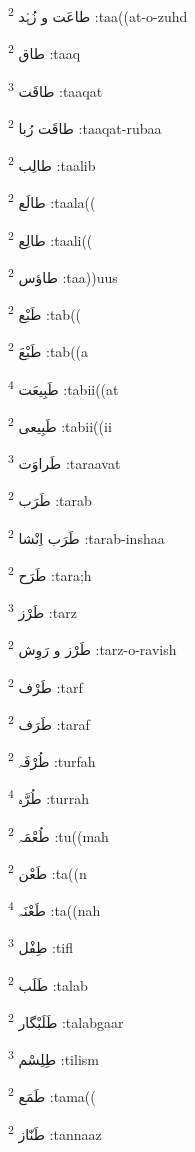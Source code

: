 \documentclass[12pt]{article}
\begin{document}
\begin{multicols}{5}
{\ur طاعَت و زُہْد}   \textsuperscript{2} :taa((at-o-zuhd

{\ur طاق}   \textsuperscript{2} :taaq

{\ur طاقَت}   \textsuperscript{3} :taaqat

{\ur طاقَت رُبا}   \textsuperscript{2} :taaqat-rubaa

{\ur طالِب}   \textsuperscript{2} :taalib

{\ur طالَع}   \textsuperscript{2} :taala((

{\ur طالِع}   \textsuperscript{2} :taali((

{\ur طاؤس}   \textsuperscript{2} :taa))uus

{\ur طَبْع}   \textsuperscript{2} :tab((

{\ur طَبْعَ}   \textsuperscript{2} :tab((a

{\ur طَبِیعَت}   \textsuperscript{4} :tabii((at

{\ur طَبِیعی}   \textsuperscript{2} :tabii((ii

{\ur طَراوَت}   \textsuperscript{3} :taraavat

{\ur طَرَب}   \textsuperscript{2} :tarab

{\ur طَرَب اِنْشا}   \textsuperscript{2} :tarab-inshaa

{\ur طَرَح}   \textsuperscript{2} :tara;h

{\ur طَرْز}   \textsuperscript{3} :tarz

{\ur طَرْز و رَوِش}   \textsuperscript{2} :tarz-o-ravish

{\ur طَرْف}   \textsuperscript{2} :tarf

{\ur طَرَف}   \textsuperscript{2} :taraf

{\ur طُرْفَہ}   \textsuperscript{2} :turfah

{\ur طُرَّہ}   \textsuperscript{4} :turrah

{\ur طُعْمَہ}   \textsuperscript{2} :tu((mah

{\ur طَعْن}   \textsuperscript{2} :ta((n

{\ur طَعْنَہ}   \textsuperscript{4} :ta((nah

{\ur طِفْل}   \textsuperscript{3} :tifl

{\ur طَلَب}   \textsuperscript{2} :talab

{\ur طَلَبْگار}   \textsuperscript{2} :talabgaar

{\ur طِلِسْم}   \textsuperscript{3} :tilism

{\ur طَمَع}   \textsuperscript{2} :tama((

{\ur طَنّاز}   \textsuperscript{2} :tannaaz


\end{multicols}
\end{document}
